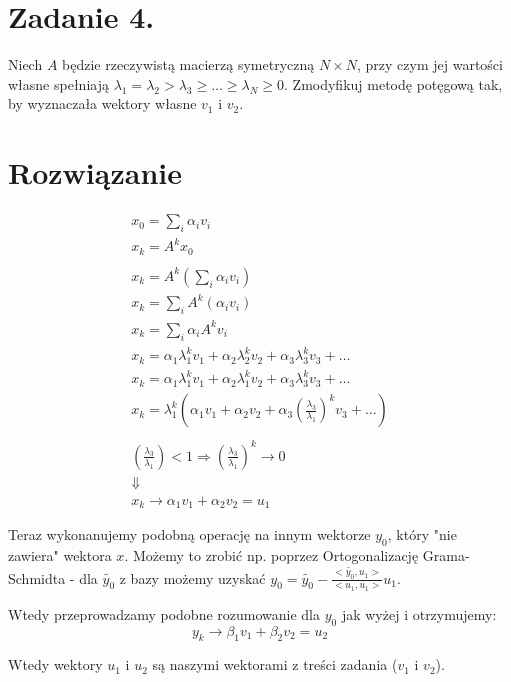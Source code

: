\documentclass[a4paper]{article}
\renewcommand{\ge}{\geqslant} %
\begin{document}
   \section*{Zadanie 4.}

      Niech $A$ będzie rzeczywistą macierzą symetryczną $N \times N$, przy czym jej wartości własne spełniają
      $\lambda_{1} = \lambda_{2} > \lambda_{3} \ge \dots \ge \lambda_{N} \ge 0$.
      Zmodyfikuj metodę potęgową tak, by wyznaczała wektory własne $v_{1}$ i $v_{2}$.


   \section*{\large Rozwiązanie}
      \begin{gather*}
         x_{0} = \sum_{i} \alpha_{i} v_{i} \\
         x_{k} = A^{k} x_{0} \\
         \\
         x_{k} = A^{k} (\sum_{i} \alpha_{i} v_{i}) \\
         x_{k} = \sum_{i} A^{k} (\alpha_{i} v_{i}) \\
         x_{k} = \sum_{i} \alpha_{i}  A^{k} v_{i} \\
         x_{k} = \alpha_{1} \lambda_{1}^{k} v_{1} + \alpha_{2} \lambda_{2}^{k} v_{2}
            + \alpha_{3} \lambda_{3}^{k} v_{3} + \dots \\
         x_{k} = \alpha_{1} \lambda_{1}^{k} v_{1} + \alpha_{2} \lambda_{1}^{k} v_{2}
            + \alpha_{3} \lambda_{3}^{k} v_{3} + \dots \\
         x_{k} = \lambda_{1}^{k} (\alpha_{1} v_{1} + \alpha_{2} v_{2}
            + \alpha_{3} (\frac{\lambda_{3}}{\lambda_{1}})^{k} v_{3} + \dots) \\
         \\
         (\frac{\lambda_{3}}{\lambda_{1}}) < 1 \Longrightarrow
         (\frac{\lambda_{3}}{\lambda_{1}})^{k} \longrightarrow 0 \\
         \Downarrow \\
         x_{k} \longrightarrow \alpha_{1} v_{1} + \alpha_{2} v_{2} = u_{1}
      \end{gather*}

      Teraz wykonanujemy podobną operację na innym wektorze $y_{0}$, który "nie zawiera" wektora $x$.
      Możemy to zrobić np. poprzez Ortogonalizację Grama-Schmidta -
      dla $\tilde{y_{0}}$ z bazy możemy uzyskać
      $y_{0} = \tilde{y_{0}} - \frac{<\tilde{y_{0}}, u_{1}>}{<u_{1}, u_{1}>}  u_{1}$.

      Wtedy przeprowadzamy podobne rozumowanie dla $y_{0}$ jak wyżej i otrzymujemy:
      \[
         y_{k} \longrightarrow \beta_{1} v_{1} + \beta_{2} v_{2} = u_{2}
      \]

      Wtedy wektory $u_{1}$ i ${u_{2}}$ są naszymi wektorami z treści zadania ($v_{1}$ i $v_{2}$).
\end{document}
